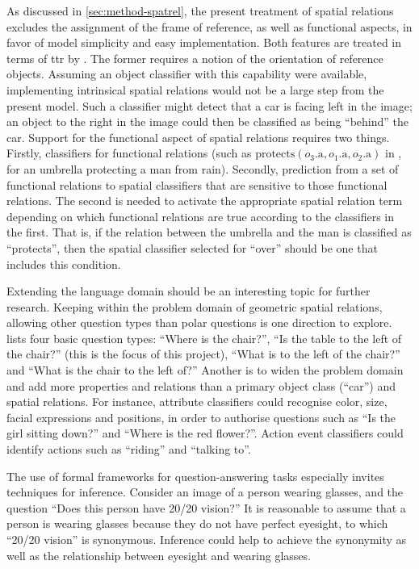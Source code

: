 As discussed in \autoref{sec:method-spatrel}, the present treatment of spatial relations excludes the assignment of the frame of reference, as well as functional aspects, in favor of model simplicity and easy implementation.
Both features are treated in terms of \gls{ttr} by \cite{ttrspat}.
The former requires a notion of the orientation of reference objects.
Assuming an object classifier with this capability were available, implementing intrinsical spatial relations would not be a large step from the present model.
Such a classifier might detect that a car is facing left in the image;
an object to the right in the image could then be classified as being ``behind'' the car.
Support for the functional aspect of spatial relations requires two things.
Firstly, classifiers for functional relations (such as $\text{protects}(o_3\text{.a}, o_1\text{.a}, o_2\text{.a})$ in \cite{ttrspat}, for an umbrella protecting a man from rain).
Secondly, prediction from a set of functional relations to spatial classifiers that are sensitive to those functional relations.
The second is needed to activate the appropriate spatial relation term depending on which functional relations are true according to the classifiers in the first.
That is, if the relation between the umbrella and the man is classified as ``protects'', then the spatial classifier selected for ``over'' should be one that includes this condition.

Extending the language domain should be an interesting topic for further research.
Keeping within the problem domain of geometric spatial relations, allowing other question types than polar questions is one direction to explore.
\citet[p. 156]{DobnikTeachingmobilerobots2009} lists four basic question types:
``Where is the chair?'',
``Is the table to the left of the chair?'' (this is the focus of this project),
``What is to the left of the chair?'' and
``What is the chair to the left of?''
Another is to widen the problem domain and add more properties and relations than a primary object class (``car'') and spatial relations.
For instance, attribute classifiers could recognise color, size, facial expressions and positions, in order to authorise questions such as ``Is the girl sitting down?'' and ``Where is the red flower?''.
Action event classifiers could identify actions such as ``riding'' and ``talking to''.

The use of formal frameworks for question-answering tasks especially invites techniques for inference.
Consider an image of a person wearing glasses, and the question ``Does this person have 20/20 vision?''
It is reasonable to assume that a person is wearing glasses because they do not have perfect eyesight, to which ``20/20 vision'' is synonymous.
Inference could help to achieve the synonymity as well as the relationship between eyesight and wearing glasses.

